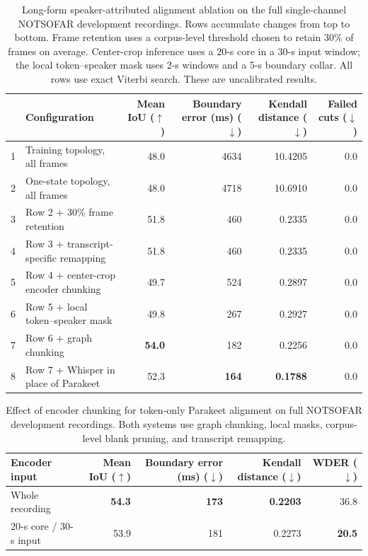 \begin{table}[t]
  \centering
  \caption{Long-form speaker-attributed alignment ablation on the full
  single-channel NOTSOFAR development recordings. Rows accumulate changes
  from top to bottom. Frame retention uses a corpus-level threshold chosen to
  retain 30\% of frames on average. Center-crop inference uses a 20-s core in
  a 30-s input window; the local token--speaker mask uses 2-s windows and a
  5-s boundary collar. All rows use exact Viterbi search. These are
  uncalibrated results.}
    \label{tab:long-form-ablation}
  \small
  \setlength{\tabcolsep}{4pt}
  \begin{tabular}{clrrrr}
    \toprule
    & Configuration & Mean IoU ($\uparrow$) &
      Boundary error (ms) ($\downarrow$) &
      Kendall distance ($\downarrow$) & Failed cuts ($\downarrow$) \\
    \midrule
    1 & Training topology, all frames                         & 48.0 & 4634 & 10.4205 & 0.0 \\
    2 & One-state topology, all frames                        & 48.0 & 4718 & 10.6910 & 0.0 \\
    3 & Row 2 + 30\% frame retention                          & 51.8 &  460 &  0.2335 & 0.0 \\
    4 & Row 3 + transcript-specific remapping                 & 51.8 &  460 &  0.2335 & 0.0 \\
    5 & Row 4 + center-crop encoder chunking                  & 49.7 &  524 &  0.2897 & 0.0 \\
    6 & Row 5 + local token--speaker mask                     & 49.8 &  267 &  0.2927 & 0.0 \\
    7 & Row 6 + graph chunking                                & \textbf{54.0} & 182 & 0.2256 & 0.0 \\
    8 & Row 7 + Whisper in place of Parakeet                  & 52.3 & \textbf{164} & \textbf{0.1788} & 0.0 \\
    \bottomrule
  \end{tabular}
\end{table}

\begin{table}[t]
  \centering
  \caption{Effect of encoder chunking for token-only Parakeet alignment on
  full NOTSOFAR development recordings. Both systems use graph chunking,
  local masks, corpus-level blank pruning, and transcript remapping.}
  \label{tab:alignment-chunking}
  \small
  \begin{tabular}{lrrrr}
    \toprule
    Encoder input & Mean IoU ($\uparrow$) &
      Boundary error (ms) ($\downarrow$) & Kendall distance ($\downarrow$) &
      WDER ($\downarrow$) \\
    \midrule
    Whole recording        & \textbf{54.3} & \textbf{173} & \textbf{0.2203} & 36.8 \\
    20-s core / 30-s input & 53.9 & 181 & 0.2273 & \textbf{20.5} \\
    \bottomrule
  \end{tabular}
\end{table}

